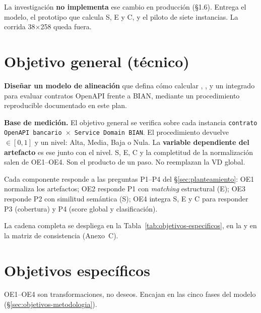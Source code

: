La investigación \textbf{no implementa} ese cambio en producción (§1.6). Entrega el modelo, el
prototipo que calcula S, E y C, y el piloto de siete instancias. La corrida 38$\times$258 queda
fuera.

\section{Objetivo general (técnico)}

\textbf{Diseñar un modelo de alineación} que defina cómo calcular \SemanticScore{},
\StructuralScore{}, \CoverageScore{} y un \AlignmentScore{} integrado para evaluar contratos
OpenAPI frente a \ServiceDomain{} BIAN, mediante un procedimiento reproducible documentado en este
plan.

\textbf{Base de medición.} El objetivo general se verifica sobre cada instancia
\texttt{contrato OpenAPI bancario $\times$ Service Domain BIAN}. El procedimiento devuelve
\AlignmentScore{} $\in [0,1]$ y un nivel: Alta, Media, Baja o Nula. La
\textbf{variable dependiente del artefacto} es ese \AlignmentScore{} junto con el nivel. S, E, C y
la completitud de la normalización salen de OE1--OE4. Son el producto de un paso. No reemplazan la
VD global.

Cada componente responde a las preguntas P1--P4 del §\ref{sec:planteamiento}: OE1 normaliza los
artefactos; OE2 responde P1 con \textit{matching} estructural (E); OE3 responde P2 con similitud
semántica (S); OE4 integra S, E y C para responder P3 (cobertura) y P4 (score global y
clasificación).

La cadena completa se despliega en la Tabla~\ref{tab:objetivos-especificos}, en la
 y en la matriz de consistencia (Anexo~C).

\section{Objetivos específicos}

OE1--OE4 son transformaciones, no deseos. Encajan en las cinco fases del modelo
(§\ref{sec:objetivos-metodologia}).

